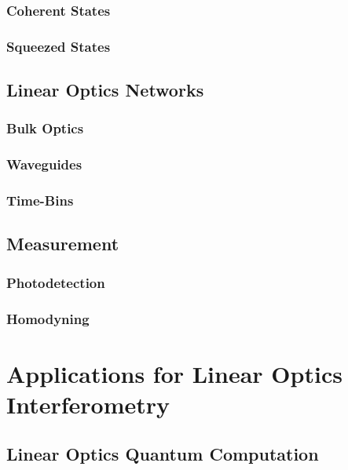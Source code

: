 \documentclass[aps,rmp,twocolumn,amsmath,amssymb,nofootinbib,superscriptaddress]{revtex4}
\newcommand{\comment}[1]{{\color{blue}{#1}}}
\begin{document}
\subsubsection{Coherent States}

\subsubsection{Squeezed States}

\subsection{Linear Optics Networks}

\subsubsection{Bulk Optics}

\subsubsection{Waveguides}

\subsubsection{Time-Bins}

\comment{Discuss fibre-loop architecture}

\subsection{Measurement}

\subsubsection{Photodetection}

\comment{Discuss number-resolved and bucket detectors, multiplexed detection, APDs, current micropillar detectors}

\subsubsection{Homodyning}

\section{Applications for Linear Optics Interferometry}

\subsection{Linear Optics Quantum Computation}
\end{document}
